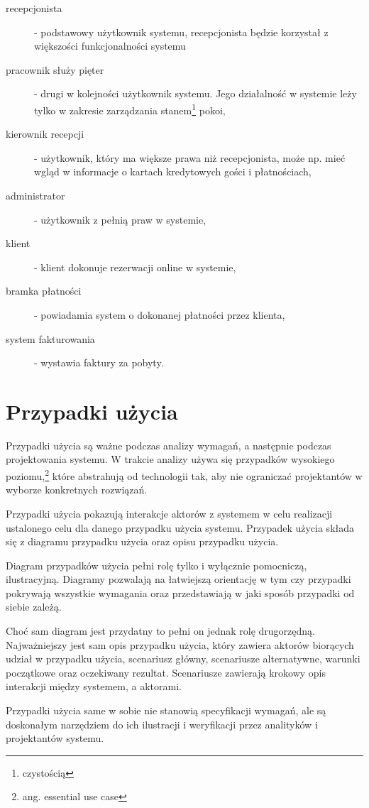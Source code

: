 \documentclass[a4paper,onecolumn,oneside,11pt,wide,floatssmall]{mwrep}
\theoremstyle{definition}
\theoremstyle{plain}%
\theoremstyle{remark}
\begin{document}
\begin{description}
  \item[recepcjonista] - podstawowy użytkownik systemu, recepcjonista będzie korzystał z większości funkcjonalności systemu
  \item[pracownik służy pięter] - drugi w kolejności użytkownik systemu. Jego działalność w systemie leży tylko w zakresie zarządzania stanem\footnote{czystością} pokoi,
  \item[kierownik recepcji] - użytkownik, który ma większe prawa niż recepcjonista, może np. mieć wgląd w informacje o kartach kredytowych gości i płatnościach,
  \item[administrator] - użytkownik z pełnią praw w systemie,
  \item[klient] - klient dokonuje rezerwacji online w systemie,
  \item[bramka płatności] - powiadamia system o dokonanej płatności przez klienta,
  \item[system fakturowania] - wystawia faktury za pobyty.
\end{description}

\section{Przypadki użycia}
Przypadki użycia są ważne podczas analizy wymagań, a następnie podczas projektowania systemu. W trakcie analizy używa się przypadków wysokiego poziomu,\footnote{ang. essential use case} które abstrahują od technologii tak, aby nie ograniczać projektantów w wyborze konkretnych rozwiązań.

Przypadki użycia pokazują interakcje aktorów z systemem w celu realizacji ustalonego celu dla danego przypadku użycia systemu. Przypadek użycia składa się z diagramu przypadku użycia oraz opisu przypadku użycia. 

Diagram przypadków użycia pełni rolę tylko i wyłącznie pomocniczą, ilustracyjną. Diagramy pozwalają na łatwiejszą orientację w tym czy przypadki pokrywają wszystkie wymagania oraz przedstawiają w jaki sposób przypadki od siebie zależą.

Choć sam diagram jest przydatny to pełni on jednak rolę drugorzędną. Najważniejszy jest sam opis przypadku użycia, który zawiera aktorów biorących udział w przypadku użycia, scenariusz główny, scenariusze alternatywne, warunki początkowe oraz oczekiwany rezultat. Scenariusze zawierają krokowy opis interakcji między systemem, a aktorami.

Przypadki użycia same w sobie nie stanowią specyfikacji wymagań, ale są doskonałym narzędziem do ich ilustracji i weryfikacji przez analityków i projektantów systemu.
\end{document}
